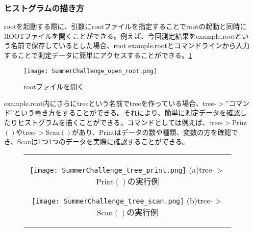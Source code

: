 \documentclass[10pt,a4j]{jarticle}
\begin{document}
\subsubsection{ヒストグラムの描き方}
rootを起動する際に、引数にrootファイルを指定することでrootの起動と同時にROOTファイルを開くことができる。例えば、今回測定結果をexample.rootという名前で保存しているとした場合、root example.rootとコマンドラインから入力することで測定データに簡単にアクセスすることができる。\ref{fig:open_ROOT}
\begin{figure}[h]
\begin{center}
\texttt{[image: SummerChallenge\_open\_root.png]}
\caption{rootファイルを開く}
\label{fig:open_ROOT}
\end{center}
\end{figure}

example.root内にさらにtreeという名前でtreeを作っている場合、tree-$>$''コマンド''という書き方をすることができる。それにより、簡単に測定データを確認したりヒストグラムを描くことができる。コマンドとしては例えば、tree-$>$Print$\left(\right)$やtree-$>$Scan$\left(\right)$があり、Printはデータの数や種類、変数の方を確認でき、Scanは1つ1つのデータを実際に確認することができる。
\begin{figure}[htbp]
\begin{center}
  \begin{tabular}{c}

    \begin{minipage}{0.5\hsize}
      \begin{center}
        \texttt{[image: SummerChallenge\_tree\_print.png]}
        \hspace{1.6cm} (a)tree-$>$Print$\left(\right)$の実行例
      \end{center}
    \end{minipage}

    \begin{minipage}{0.5\hsize}
      \begin{center}
        \texttt{[image: SummerChallenge\_tree\_scan.png]}
        \hspace{1.6cm} (b)tree-$>$Scan$\left(\right)$の実行例
      \end{center}
    \end{minipage}
  \end{tabular}
  \end{center}
\end{figure}
\end{document}
